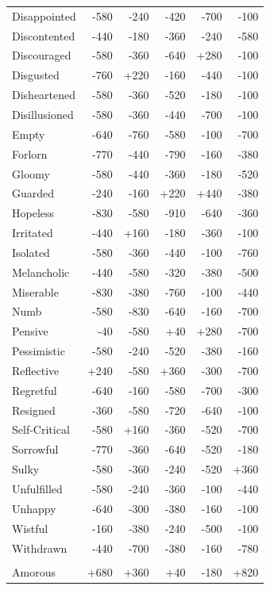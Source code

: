 \begin{longtable}{@{}p{}rrrrr@{}}
Disappointed & -580 & -240 & -420 & -700 & -100 \\
Discontented & -440 & -180 & -360 & -240 & -580 \\
Discouraged & -580 & -360 & -640 & +280 & -100 \\
Disgusted & -760 & +220 & -160 & -440 & -100 \\
Disheartened & -580 & -360 & -520 & -180 & -100 \\
Disillusioned & -580 & -360 & -440 & -700 & -100 \\
Empty & -640 & -760 & -580 & -100 & -700 \\
Forlorn & -770 & -440 & -790 & -160 & -380 \\
Gloomy & -580 & -440 & -360 & -180 & -520 \\
Guarded & -240 & -160 & +220 & +440 & -380 \\
Hopeless & -830 & -580 & -910 & -640 & -360 \\
Irritated & -440 & +160 & -180 & -360 & -100 \\
Isolated & -580 & -360 & -440 & -100 & -760 \\
Melancholic & -440 & -580 & -320 & -380 & -500 \\
Miserable & -830 & -380 & -760 & -100 & -440 \\
Numb & -580 & -830 & -640 & -160 & -700 \\
Pensive & -40 & -580 & +40 & +280 & -700 \\
Pessimistic & -580 & -240 & -520 & -380 & -160 \\
Reflective & +240 & -580 & +360 & -300 & -700 \\
Regretful & -640 & -160 & -580 & -700 & -300 \\
Resigned & -360 & -580 & -720 & -640 & -100 \\
Self-Critical & -580 & +160 & -360 & -520 & -700 \\
Sorrowful & -770 & -360 & -640 & -520 & -180 \\
Sulky & -580 & -360 & -240 & -520 & +360 \\
Unfulfilled & -580 & -240 & -360 & -100 & -440 \\
Unhappy & -640 & -300 & -380 & -160 & -100 \\
Wistful & -160 & -380 & -240 & -500 & -100 \\
Withdrawn & -440 & -700 & -380 & -160 & -780 \\
\addlinespace[2pt]\multicolumn{6}{@{}l}{\textbf{High-Arousal Positive} ($n=37$)} \\
Amorous & +680 & +360 & +40 & -180 & +820 \\

\end{longtable}
